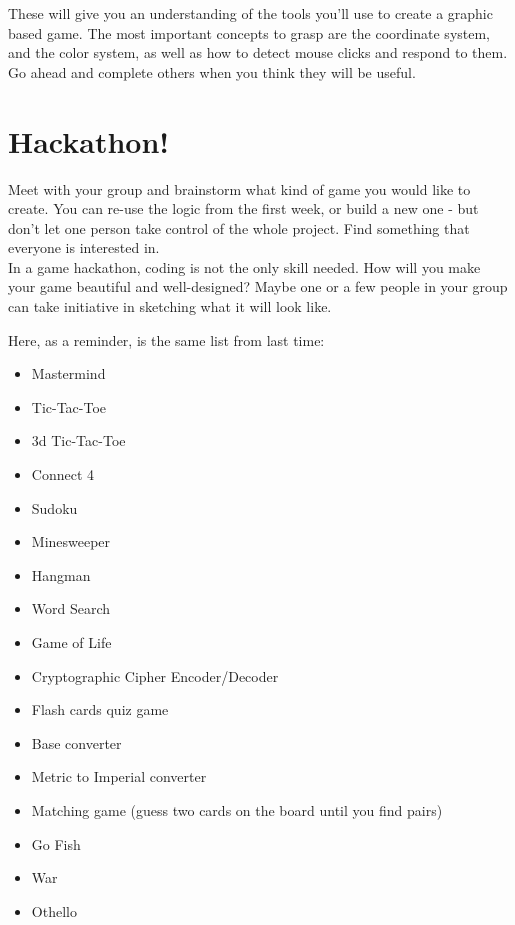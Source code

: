 \documentclass{42-en}
\begin{document}
These will give you an understanding of the tools you'll use to create a graphic based game. The most important concepts to grasp are the coordinate system, and the color system, as well as how to detect mouse clicks and respond to them. Go ahead and complete others when you think they will be useful.



\chapter{Hackathon!}

Meet with your group and brainstorm what kind of game you would like to create. You can re-use the logic from the first week, or build a new one - but don't let one person take control of the whole project. Find something that everyone is interested in.\\

In a game hackathon, coding is not the only skill needed. How will you make your game beautiful and well-designed? Maybe one or a few people in your group can take initiative in sketching what it will look like.

Here, as a reminder, is the same list from last time:

\begin{itemize}

	\item Mastermind
	\item Tic-Tac-Toe
	\item 3d Tic-Tac-Toe
	\item Connect 4
	\item Sudoku
	\item Minesweeper
	\item Hangman
	\item Word Search
	\item Game of Life
	\item Cryptographic Cipher Encoder/Decoder
	\item Flash cards quiz game
	\item Base converter
	\item Metric to Imperial converter
	\item Matching game (guess two cards on the board until you find pairs)
	\item Go Fish
	\item War
	\item Othello

\end{itemize}
\end{document}
